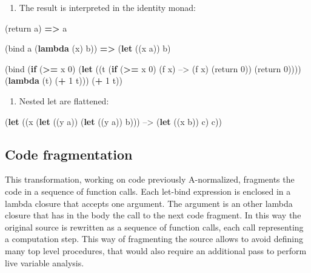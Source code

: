 \documentclass[12pt,a4paper,oneside,openright]{book}
\newenvironment{Shaded}{\begin{snugshade}}{\end{snugshade}}
\newcommand{\KeywordTok}[1]{\textcolor[rgb]{0.13,0.29,0.53}{\textbf{{#1}}}}
\newcommand{\DecValTok}[1]{\textcolor[rgb]{0.00,0.00,0.81}{{#1}}}
\newcommand{\NormalTok}[1]{{#1}}
\providecommand{\tightlist}{%
  \setlength{\itemsep}{0pt}\setlength{\parskip}{0pt}}
\begin{document}
\begin{enumerate}
\def\labelenumi{\arabic{enumi}.}
\setcounter{enumi}{1}
\tightlist
\item
  The result is interpreted in the identity monad:
\end{enumerate}

\begin{Shaded}
\begin{Highlighting}[]
                \NormalTok{(return a)  }\KeywordTok{=>}  \NormalTok{a}

   \NormalTok{(bind a (}\KeywordTok{lambda} \NormalTok{(x) b))  }\KeywordTok{=>}  \NormalTok{(}\KeywordTok{let} \NormalTok{((x a)) b)}


   \NormalTok{(bind (}\KeywordTok{if} \NormalTok{(}\KeywordTok{>=} \NormalTok{x }\DecValTok{0}\NormalTok{)               (}\KeywordTok{let} \NormalTok{((t (}\KeywordTok{if} \NormalTok{(}\KeywordTok{>=} \NormalTok{x }\DecValTok{0}\NormalTok{)}
             \NormalTok{(f x)          -->                  (f x)}
             \NormalTok{(return }\DecValTok{0}\NormalTok{))                         (return }\DecValTok{0}\NormalTok{))))}
          \NormalTok{(}\KeywordTok{lambda} \NormalTok{(t) (}\KeywordTok{+} \DecValTok{1} \NormalTok{t)))        (}\KeywordTok{+} \DecValTok{1} \NormalTok{t))}
\end{Highlighting}
\end{Shaded}

\begin{enumerate}
\def\labelenumi{\arabic{enumi}.}
\setcounter{enumi}{2}
\tightlist
\item
  Nested let are flattened:
\end{enumerate}

\begin{Shaded}
\begin{Highlighting}[]
   \NormalTok{(}\KeywordTok{let} \NormalTok{((x (}\KeywordTok{let} \NormalTok{((y a))               (}\KeywordTok{let} \NormalTok{((y a))}
              \NormalTok{b)))          -->          (}\KeywordTok{let} \NormalTok{((x b))}
     \NormalTok{c)                                    c))}
\end{Highlighting}
\end{Shaded}

\subsection{Code fragmentation}\label{code-fragmentation}

This transformation, working on code previously A-normalized, fragments
the code in a sequence of function calls. Each let-bind expression is
enclosed in a lambda closure that accepts one argument. The argument is
an other lambda closure that has in the body the call to the next code
fragment. In this way the original source is rewritten as a sequence of
function calls, each call representing a computation step. This way of
fragmenting the source allows to avoid defining many top level
procedures, that would also require an additional pass to perform live
variable analysis.
\end{document}
